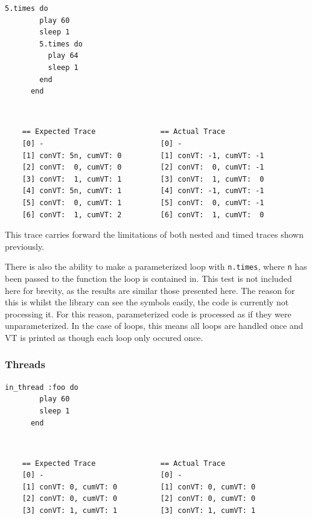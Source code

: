 \documentclass[11pt, abstracton, twoside, titlepage=true]{scrartcl}
\begin{document}
\begin{minipage}{\textwidth}
	\begin{lstlisting}[style = sonicpi]
      5.times do
        play 60
        sleep 1
        5.times do
          play 64
          sleep 1
        end
      end
	\end{lstlisting}
\end{minipage}
\\
\begin{lstlisting}
    == Expected Trace               == Actual Trace
    [0] -                           [0] -
    [1] conVT: 5n, cumVT: 0         [1] conVT: -1, cumVT: -1
    [2] conVT:  0, cumVT: 0         [2] conVT:  0, cumVT: -1
    [3] conVT:  1, cumVT: 1         [3] conVT:  1, cumVT:  0
    [4] conVT: 5n, cumVT: 1         [4] conVT: -1, cumVT: -1
    [5] conVT:  0, cumVT: 1         [5] conVT:  0, cumVT: -1
    [6] conVT:  1, cumVT: 2         [6] conVT:  1, cumVT:  0
\end{lstlisting}

This trace carries forward the limitations of both nested and timed traces shown 
previously.

There is also the ability to make a parameterized loop with \texttt{n.times},
where \texttt{n} has been passed to the function the loop is contained in. This
test is not included here for brevity, as the results are similar those presented
here. The reason for this is whilst the library can see the symbols easily,
the code is currently not processing it. For this reason, parameterized code
is processed as if they were unparameterized. In the case of loops, this means
all loops are handled once and VT is printed as though each loop only occured once.

\subsubsection{Threads}
\begin{minipage}{\textwidth}
	\begin{lstlisting}[style = sonicpi]
      in_thread :foo do
        play 60
        sleep 1
      end
	\end{lstlisting}
\end{minipage}
\\
\begin{lstlisting}
    == Expected Trace               == Actual Trace
    [0] -                           [0] -
    [1] conVT: 0, cumVT: 0          [1] conVT: 0, cumVT: 0
    [2] conVT: 0, cumVT: 0          [2] conVT: 0, cumVT: 0
    [3] conVT: 1, cumVT: 1          [3] conVT: 1, cumVT: 1
\end{lstlisting}
\end{document}
